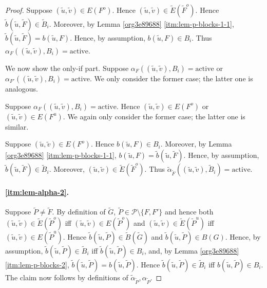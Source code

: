 \documentclass[fontsize=11pt,paper=a4]{book}
\begin{document}
\begin{proof}
Suppose \((\tilde{u},\tilde{v})\in E(F^o)\).
Hence \((\tilde{u},\tilde{v})\in\tilde{E}(\tilde{F}^o)\).
Hence \(\tilde{b}(\tilde{u},\tilde{F})\in\tilde{B}_i\).
Moreover, by Lemma \ref{org3e89688} \ref{itm:lem-p-blocks-1-1}, \(\tilde{b}(\tilde{u},\tilde{F})=b(\tilde{u},F)\).
Hence, by assumption, \(b(\tilde{u},F)\in B_i\).
Thus \(\alpha_F((\tilde{u},\tilde{v}),B_i)=\mathrm{active}\).

We now show the only-if part.
Suppose \(\alpha_F((\tilde{u},\tilde{v}),B_i)=\mathrm{active}\) or \(\alpha_{F'}((\tilde{u},\tilde{v}),B_i)=\mathrm{active}\).
We only consider the former case; the latter one is analogous.

Suppose \(\alpha_F((\tilde{u},\tilde{v}),B_i)=\mathrm{active}\).
Hence \((\tilde{u},\tilde{v})\in E(F^o)\) or \((\tilde{u},\tilde{v})\in E(F^u)\).
We again only consider the former case; the latter one is similar.

Suppose \((\tilde{u},\tilde{v})\in E(F^o)\).
Hence \(b(\tilde{u},F)\in B_i\).
Moreover, by Lemma \ref{org3e89688} \ref{itm:lem-p-blocks-1-1}, \(b(\tilde{u},F)=\tilde{b}(\tilde{u},\tilde{F})\).
Hence, by assumption, \(\tilde{b}(\tilde{u},\tilde{F})\in\tilde{B}_i\).
Moreover, \((\tilde{u},\tilde{v})\in\tilde{E}(\tilde{F}^o)\).
Thus \(\tilde{\alpha}_{\tilde{F}}((\tilde{u},\tilde{v}),\tilde{B}_i)=\mathrm{active}\).

\paragraph{\ref{itm:lem-alpha-2}.}
Suppose \(\tilde{P}\neq\tilde{F}\).
By definition of \(\tilde{G}\), \(\tilde{P}\in\mathcal{P}\setminus\{F,F'\}\) and hence both \((\tilde{u},\tilde{v})\in\tilde{E}(\tilde{P}^o)\) iff \((\tilde{u},\tilde{v})\in E(\tilde{P}^o)\) and \((\tilde{u},\tilde{v})\in\tilde{E}(\tilde{P}^u)\) iff \((\tilde{u},\tilde{v})\in E(\tilde{P}^u)\).
Hence \(\tilde{b}(\tilde{u},\tilde{P})\in\tilde{B}(\tilde{G})\) and \(\tilde{b}(\tilde{u},\tilde{P})\in B(G)\).
Hence, by assumption, \(\tilde{b}(\tilde{u},\tilde{P})\in\tilde{B}_i\) iff \(\tilde{b}(\tilde{u},\tilde{P})\in B_i\), and, by Lemma \ref{org3e89688} \ref{itm:lem-p-blocks-2}, \(\tilde{b}(\tilde{u},\tilde{P})=b(\tilde{u},\tilde{P})\).
Hence \(\tilde{b}(\tilde{u},\tilde{P})\in\tilde{B}_i\) iff \(b(\tilde{u},\tilde{P})\in B_i\).
The claim now follows by definitions of \(\tilde{\alpha}_{\tilde{P}},\alpha_{\tilde{P}}\).
\end{proof}
\end{document}
